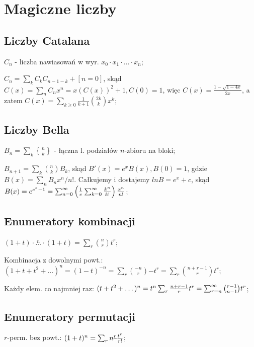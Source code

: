 \section{Magiczne liczby}

\begin{tiny}
\end{tiny}

\subsection{Liczby Catalana}

\entry
$C_n$ - liczba nawiasowań w wyr. $x_0 \cdot x_1 \cdot \dots \cdot x_n$;

\entry
$C_n = \sum_kC_kC_{n-1-k} + [n=0]$,
  skąd $C(x) = \sum_n C_nx^n = x(C(x))^2 + 1, C(0) = 1$,
  więc $C(x) = \frac{1 - \sqrt{1-4x}}{2x}$, a zatem $C(x) =
  \sum_{k\geq 0} \frac{1}{k+1}\binom{2k}{k}x^k$;

\subsection{Liczby Bella}

\entry
${B_n = \sum_k{n \brace k}}$ - łączna l. podziałów $n$-zbioru na bloki;

\entry
${B_{n+1} = \sum_k \binom{n}{k} B_k}$, skąd $B'(x) = e^xB(x), B(0) = 1$,
  gdzie $B(x) = \sum_n B_nx^n/n!$. Całkujemy i dostajemy $ln B = e^x + c$,
  skąd $B(x) = e^{e^x-1} =
  \sum_{n=0}^\infty \left ( {1 \over e} \sum_{k=0}^\infty {k^n \over k!}\right)
  {x^n \over n!}$;

\subsection{Enumeratory kombinacji}

\entry
$(1+t)\cdot\overset{n}{\ldots}\cdot(1+t) = \sum_r\binom{n}{r}t^r$;

\entry
Kombinacja z dowolnymi powt.: $(1+t+t^2+\dots)^n=(1-t)^{-n}=
  \sum_r\binom{-n}{r}{-t}^r=\sum_r\binom{n+r-1}{r}t^r$;

\entry
Każdy elem. co najmniej raz: $(t+t^2+\dots)^n = t^n\sum_r {n+r-1 \over r}t^r =
  \sum^\infty_{r=n}\binom{r-1}{n-1}t^r$;

\subsection{Enumeratory permutacji}

\entry
$r$-perm. bez powt.: $(1+t)^n = \sum_rn^{\underline{r}}{t^r \over r!}$;

